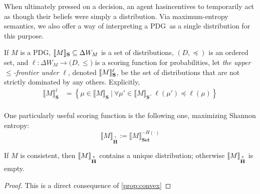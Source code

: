 \documentclass{article}
\newcommand\Set{\textbf{Set}}
\newcommand\MaxEnt{{\overset{\uparrow}{\mathbf H}}}
\newcommand{\MN}{PDG}
\begin{document}
	
	When ultimately pressed on a decision, an agent hasincentives to temporarily act as though their beliefs were simply a distribution. Via maximum-entropy semantics, we also offer a way of interpreting a \MN\ as a single distribution for this purpose. 
	
	\begin{defn}
		If  $M$ is a \MN, $\llbracket M\rrbracket_{\mathbf S} \subseteq \Delta W_{M}$ is a set of distributions, $(D, \preceq)$ is an ordered set, and $\ell : \Delta W_{M} \to \mathbb (D, \leq)$ is a scoring function for probabilities, let \emph{the upper $\leq$-frontier under $\ell$}, denoted $\llbracket M\rrbracket_{\mathbf S}^\ell$, be the set of distributions that are not strictly dominated by any others. Explicitly,
		\begin{align*}
			\llbracket M \rrbracket_{\mathbf S}^\ell &=  \left\{\mu \in \llbracket M \rrbracket_{\mathbf S} ~\Big|~ \forall \mu' \in \llbracket M \rrbracket_{\mathbf S}.~ \ell(\mu') \preceq \ell(\mu)  \right\} \\
		\end{align*}
	\end{defn}
	One particularly useful scoring function is the following one, maximizing Shannon entropy:
	\[ \Big\llbracket M \Big\rrbracket_\MaxEnt := \Big\llbracket M \Big\rrbracket_\Set^{-H(\cdot)} \]

	\begin{theorem} 
		If $M$ is consistent, then $\bbr{M}_\MaxEnt$ contains a unique distribution; otherwise $\bbr{M}_\MaxEnt$ is empty.
	\end{theorem}
	\begin{proof}
		\vspace{-1em}
		This is a direct consequence of \cref{prop:convex}
	\end{proof}
\end{document}
